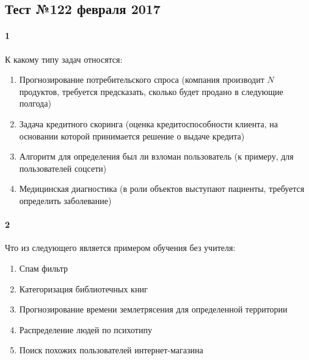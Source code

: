 \documentclass[a4paper,12pt]{article}
\begin{document}
  \subsection*{Тест №1\hfill{22 февраля 2017}}


  \paragraph{1} К какому типу задач относятся:
  \begin{enumerate}
    \item Прогнозирование потребительского спроса (компания производит $N$ продуктов, требуется предсказать, сколько будет продано в следующие полгода)\\
    \makebox[\linewidth]{\hrulefill}
    \item Задача кредитного скоринга (оценка кредитоспособности клиента, на основании которой принимается решение о выдаче кредита)\\
    \makebox[\linewidth]{\hrulefill}
    \item Алгоритм для определения был ли взломан пользователь (к примеру, для пользователей соцсети)\\
    \makebox[\linewidth]{\hrulefill}
    \item Медицинская диагностика (в роли объектов выступают пациенты, требуется определить заболевание)\\
    \makebox[\linewidth]{\hrulefill}

  \end{enumerate}

	\paragraph{2} Что из следующего является примером обучения без учителя:
    \begin{enumerate}
      \item Спам фильтр
      \item Категоризация библиотечных книг
      \item Прогнозирование времени землетрясения для определенной территории
      \item Распределение людей по психотипу
      \item Поиск похожих пользователей интернет-магазина
    \end{enumerate}    	
	
\end{document}
